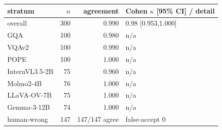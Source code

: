 \begin{tabular}{@{}lrrl@{}}
\toprule
stratum & $n$ & agreement & Cohen $\kappa$ [95\% CI] / detail \\
\midrule
overall & 300 & 0.990 & 0.98 {\scriptsize[0.953,1.000]} \\
\midrule
GQA & 100 & 0.980 & n/a \\
VQAv2 & 100 & 0.990 & n/a \\
POPE & 100 & 1.000 & n/a \\
\midrule
InternVL3.5-2B & 75 & 0.960 & n/a \\
Molmo2-4B & 76 & 1.000 & n/a \\
LLaVA-OV-7B & 75 & 1.000 & n/a \\
Gemma-3-12B & 74 & 1.000 & n/a \\
human-wrong & 147 & 147/147 agree & false-accept 0 \\
\bottomrule
\end{tabular}
